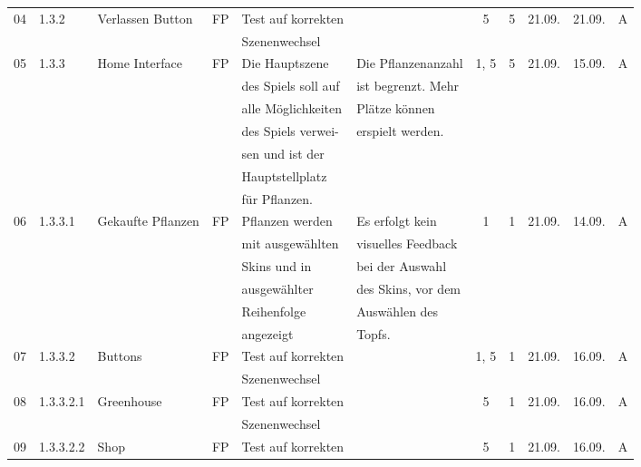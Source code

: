 \begin{longtable}{|c|l|l|c|l|l|c|c|l|l|l|}
            04 & 1.3.2 & Verlassen Button & FP & Test auf korrekten &  & 5 & 5 & 21.09. & 21.09. & A \\
            &       &            &    & Szenenwechsel &   &   & & & &\\
            \hline
            05 & 1.3.3 & Home Interface & FP & Die Hauptszene & Die Pflanzenanzahl & 1, 5 & 5 & 21.09. & 15.09. & A \\
            &       &            &    & des Spiels soll auf &  ist begrenzt. Mehr  &   & & & &\\
            &       &            &    & alle Möglichkeiten & Plätze können  &   & & & &\\
            &       &            &    & des Spiels verwei- & erspielt werden.  &   & & & &\\
            &       &            &    & sen und ist der &   &   & & & &\\
            &       &            &    & Hauptstellplatz &   &   & & & &\\
            &       &            &    & für Pflanzen. &   &   & & & &\\
            \hline
            06 & 1.3.3.1 & Gekaufte Pflanzen & FP & Pflanzen werden & Es erfolgt kein & 1 & 1 & 21.09. & 14.09. & A \\
            &       &            &    & mit ausgewählten &  visuelles Feedback  &   & & & &\\
            &       &            &    & Skins und in & bei der Auswahl  &   & & & &\\
            &       &            &    & ausgewählter & des Skins, vor dem  &   & & & &\\
            &       &            &    & Reihenfolge &  Auswählen des &   & & & &\\
            &       &            &    & angezeigt & Topfs.  &   & & & &\\
            \hline
            07 & 1.3.3.2 & Buttons & FP & Test auf korrekten &  & 1, 5 & 1 & 21.09. & 16.09. & A \\
            &       &            &    & Szenenwechsel &   &   & & & &\\
            \hline
            08 & 1.3.3.2.1 & Greenhouse & FP & Test auf korrekten &  & 5 & 1 & 21.09. & 16.09. & A \\
            &       &            &    & Szenenwechsel &   &   & & & &\\
            \hline
            09 & 1.3.3.2.2 & Shop & FP & Test auf korrekten &  & 5 & 1 & 21.09. & 16.09. & A \\

\end{longtable}
